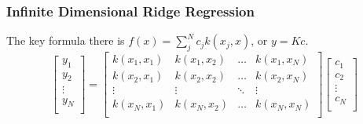 \documentclass{beamer}
\numberwithin{equation}{section}
\begin{document}
\begin{frame}
\frametitle{Infinite Dimensional Ridge Regression}
\small{The key formula there is $f(x)=\sum_j^N c_j k(x_j,x)$, or $y=Kc$.} \\
\bigskip
\pause
\bigskip
\begin{equation*}
\left[
              \begin{array}{c}
                y_1 \\
                y_2 \\
                \vdots \\
                y_N \\
              \end{array}
            \right]= \left[
       \begin{array}{cccc}
         k(x_1,x_1) & k(x_1,x_2) & \ldots & k(x_1,x_N) \\
         k(x_2,x_1) & k(x_2,x_2)  &  \ldots & k(x_2,x_N) \\
         \vdots    & \vdots &  \ddots & \vdots \\
         k(x_N,x_1) & k(x_N,x_2) & \ldots & k(x_N,x_N) \\
       \end{array}
     \right]\left[
              \begin{array}{c}
                c_1 \\
                c_2 \\
                \vdots \\
                c_N \\
              \end{array}
            \right]
\end{equation*}

\end{frame}
\end{document}
